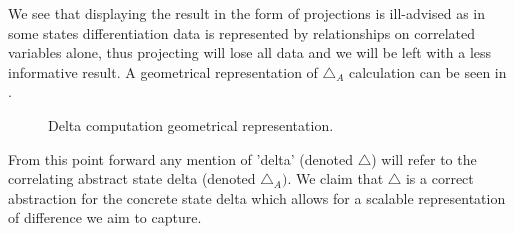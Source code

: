 We see that displaying the result in the form of projections is ill-advised as in some states differentiation data is represented by relationships on correlated variables alone, thus projecting will lose all data and we will be left with a less informative result. A geometrical representation of $\triangle_{A}$ calculation can be seen in .

\begin{figure}
\caption{Delta computation geometrical representation.}
\end{figure}



From this point forward any mention of 'delta' (denoted $\triangle$) will refer to the correlating abstract state delta (denoted $\triangle_{A})$. We claim that $\triangle$ is a correct abstraction for the concrete state delta which allows for a scalable representation of difference we aim to capture.
